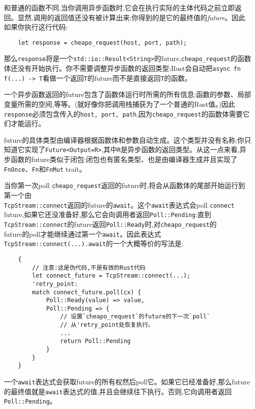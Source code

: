 和普通的函数不同,当你调用异步函数时,它会在执行实际的主体代码之前立即返回。显然,调用的返回值还没有被计算出来;你得到的是它的最终值的\emph{future}。因此如果你执行这行代码:
\begin{verbatim}
    let response = cheapo_request(host, port, path);
\end{verbatim}

那么\texttt{response}将是一个\texttt{std::io::Result<String>}的future,\texttt{cheapo\_request}的函数体还没有开始执行。你不需要调整异步函数的返回类型;Rust会自动把\texttt{async fn f(...) -> T}看做一个返回\texttt{T}的future而不是直接返回\texttt{T}的函数。

一个异步函数返回的future包含了函数体运行时所需的所有信息:函数的参数、局部变量所需的空间,等等。(就好像你把调用栈捕获为了一个普通的Rust值。)因此\texttt{response}必须包含传入的\texttt{host, port, path},因为\texttt{cheapo\_request}的函数体需要它们才能运行。

future的具体类型由编译器根据函数体和参数自动生成。这个类型并没有名称;你只知道它实现了\texttt{Future<Output=R>},其中\texttt{R}是异步函数的返回类型。从这一点来看,异步函数的future类似于闭包:闭包也有匿名类型、也是由编译器生成并且实现了\texttt{FnOnce}、\texttt{Fn}和\texttt{FnMut} trait。

当你第一次poll \texttt{cheapo\_request}返回的future时,将会从函数体的尾部开始运行到第一个由\\
\texttt{TcpStream::connect}返回的future的\texttt{await}。这个\texttt{await}表达式会poll \texttt{connect} future,如果它还没准备好,那么它会向调用者返回\texttt{Poll::Pending}:直到\texttt{TcpStream::connect}的future返回\texttt{Poll::Ready}时,对\texttt{cheapo\_request}的\\
future的poll才能继续通过第一个\texttt{await}。因此表达式\texttt{TcpStream::connect(...).await}的一个大概等价的写法是:
\begin{verbatim}
    {
        // 注意:这是伪代码,不是有效的Rust代码
        let connect_future = TcpStream::connect(...);
        'retry_point:
        match connect_future.poll(cx) {
            Poll::Ready(value) => value,
            Poll::Pending => {
                // 设置`cheapo_request`的future的下一次`poll`
                // 从'retry_point处恢复执行。
                ...
                return Poll::Pending
            }
        }
    }
\end{verbatim}

一个\texttt{await}表达式会获取future的所有权然后poll它。如果它已经准备好,那么future的最终值就是\texttt{await}表达式的值,并且会继续往下执行。否则,它向调用者返回\texttt{Poll::Pending}。

